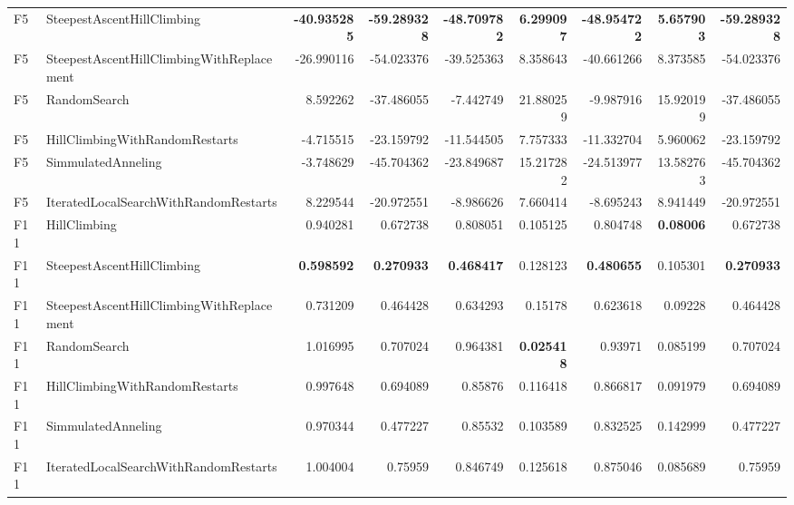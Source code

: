 \begin{tabular}{llrrrrrrr}
F5 & SteepestAscentHillClimbing & \textbf{-40.935285} & \textbf{-59.289328} & \textbf{-48.709782} & \textbf{6.299097} & \textbf{-48.954722} & \textbf{5.657903} & \textbf{-59.289328} \\ 
F5 & SteepestAscentHillClimbingWithReplacement & -26.990116 & -54.023376 & -39.525363 & 8.358643 & -40.661266 & 8.373585 & -54.023376 \\ 
F5 & RandomSearch & 8.592262 & -37.486055 & -7.442749 & 21.880259 & -9.987916 & 15.920199 & -37.486055 \\ 
F5 & HillClimbingWithRandomRestarts & -4.715515 & -23.159792 & -11.544505 & 7.757333 & -11.332704 & 5.960062 & -23.159792 \\ 
F5 & SimmulatedAnneling & -3.748629 & -45.704362 & -23.849687 & 15.217282 & -24.513977 & 13.582763 & -45.704362 \\ 
F5 & IteratedLocalSearchWithRandomRestarts & 8.229544 & -20.972551 & -8.986626 & 7.660414 & -8.695243 & 8.941449 & -20.972551 \\ 
F11 & HillClimbing & 0.940281 & 0.672738 & 0.808051 & 0.105125 & 0.804748 & \textbf{0.08006} & 0.672738 \\ 
F11 & SteepestAscentHillClimbing & \textbf{0.598592} & \textbf{0.270933} & \textbf{0.468417} & 0.128123 & \textbf{0.480655} & 0.105301 & \textbf{0.270933} \\ 
F11 & SteepestAscentHillClimbingWithReplacement & 0.731209 & 0.464428 & 0.634293 & 0.15178 & 0.623618 & 0.09228 & 0.464428 \\ 
F11 & RandomSearch & 1.016995 & 0.707024 & 0.964381 & \textbf{0.025418} & 0.93971 & 0.085199 & 0.707024 \\ 
F11 & HillClimbingWithRandomRestarts & 0.997648 & 0.694089 & 0.85876 & 0.116418 & 0.866817 & 0.091979 & 0.694089 \\ 
F11 & SimmulatedAnneling & 0.970344 & 0.477227 & 0.85532 & 0.103589 & 0.832525 & 0.142999 & 0.477227 \\ 
F11 & IteratedLocalSearchWithRandomRestarts & 1.004004 & 0.75959 & 0.846749 & 0.125618 & 0.875046 & 0.085689 & 0.75959 \\ 
\bottomrule
\end{tabular}
